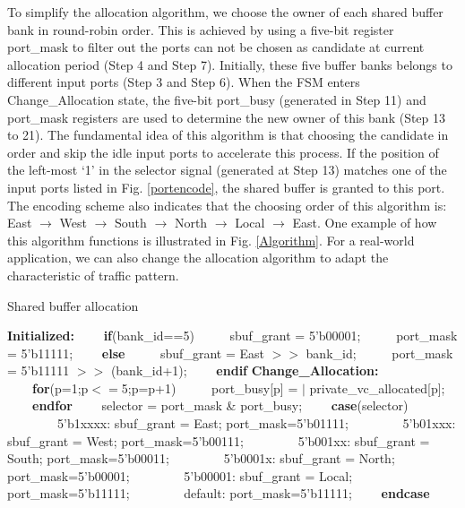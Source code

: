 \documentclass[10pt,conference]{IEEEtran}
\begin{document}
To simplify the allocation algorithm, we choose the owner of each shared buffer bank in round-robin order. This is achieved by using a five-bit register port\_mask to filter out the ports can not be chosen as candidate at current allocation period (Step 4 and Step 7). Initially, these five buffer banks belongs to different input ports (Step 3 and Step 6). When the FSM enters Change\_Allocation state, the five-bit port\_busy (generated in Step 11) and port\_mask registers are used to determine the new owner of this bank (Step 13 to 21). The fundamental idea of this algorithm is that choosing the candidate in order and skip the idle input ports to accelerate this process. If the position of the left-most `1' in the selector signal (generated at Step 13) matches one of the input ports listed in Fig. \ref{portencode}, the shared buffer is granted to this port. The encoding scheme also indicates that the choosing order of this algorithm is: East $\to$ West $\to$ South $\to$ North $\to$ Local $\to$ East. One example of how this algorithm functions is illustrated in Fig. \ref{Algorithm}. For a real-world application, we can also change the allocation algorithm to adapt the characteristic of traffic pattern.
\begin{algorithm}
\caption{Shared buffer allocation}\label{alg:bufferalloc}
\begin{algorithmic}[1]
\STATE \textbf{Initialized:}
\STATE \ \ \ \ \textbf{if}(bank\_id==5)
\STATE \ \ \ \ \ sbuf\_grant = 5'b00001;
\STATE \ \ \ \ \ port\_mask = 5'b11111;
\STATE \ \ \ \ \textbf{else}
\STATE \ \ \ \ \ sbuf\_grant = East $>>$ bank\_id;
\STATE \ \ \ \ \ port\_mask = 5'b11111 $>>$ (bank\_id+1);
\STATE \ \ \ \ \textbf{endif}
\STATE \textbf{Change\_Allocation:}
\STATE \ \ \ \ \textbf{for}(p=1;p$<=$5;p=p+1)
\STATE \ \ \ \ \ port\_busy[p] = $|$ private\_vc\_allocated[p];
\STATE \ \ \ \ \textbf{endfor}
\STATE \ \ \ \ selector = port\_mask \& port\_busy;
\STATE \ \ \ \ \textbf{case}(selector)
\STATE \ \ \ \ \ \ \ \ 5'b1xxxx: sbuf\_grant = East; port\_mask=5'b01111;
\STATE \ \ \ \ \ \ \ \ 5'b01xxx: sbuf\_grant = West; port\_mask=5'b00111;
\STATE \ \ \ \ \ \ \ \ 5'b001xx: sbuf\_grant = South; port\_mask=5'b00011;
\STATE \ \ \ \ \ \ \ \ 5'b0001x: sbuf\_grant = North; port\_mask=5'b00001;
\STATE \ \ \ \ \ \ \ \ 5'b00001: sbuf\_grant = Local; port\_mask=5'b11111;
\STATE \ \ \ \ \ \ \ \ default: port\_mask=5'b11111;
\STATE \ \ \ \ \textbf{endcase}
\end{algorithmic}
\end{algorithm}
\end{document}
